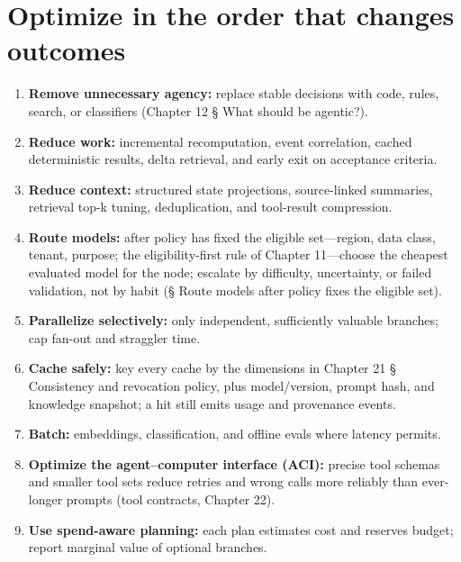 \section{Optimize in the order that changes outcomes}

\begin{enumerate}

\item \textbf{Remove unnecessary agency:} replace stable decisions with code, rules, search, or classifiers (Chapter 12 § What should be agentic?).

\item \textbf{Reduce work:} incremental recomputation, event correlation, cached deterministic results, delta retrieval, and early exit on acceptance criteria.

\item \textbf{Reduce context:} structured state projections, source-linked summaries, retrieval top-k tuning, deduplication, and tool-result compression.

\item \textbf{Route models:} after policy has fixed the eligible set—region, data class, tenant, purpose; the eligibility-first rule of Chapter 11—choose the cheapest evaluated model for the node; escalate by difficulty, uncertainty, or failed validation, not by habit (§ Route models after policy fixes the eligible set).

\item \textbf{Parallelize selectively:} only independent, sufficiently valuable branches; cap fan-out and straggler time.

\item \textbf{Cache safely:} key every cache by the dimensions in Chapter 21 § Consistency and revocation policy, plus model/version, prompt hash, and knowledge snapshot; a hit still emits usage and provenance events.

\item \textbf{Batch:} embeddings, classification, and offline evals where latency permits.

\item \textbf{Optimize the agent–computer interface (ACI):} precise tool schemas and smaller tool sets reduce retries and wrong calls more reliably than ever-longer prompts (tool contracts, Chapter 22).

\item \textbf{Use spend-aware planning:} each plan estimates cost and reserves budget; report marginal value of optional branches.

\end{enumerate}

